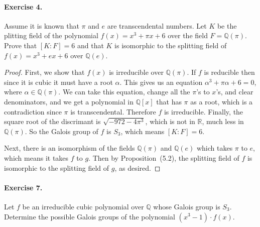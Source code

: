 \documentclass{article}
\newcommand{\Q}{\mathbb Q}
\newcommand{\R}{\mathbb R}
\begin{document}
\paragraph{Exercise 4.} Assume it is known that $\pi$ and $e$ are
transcendental numbers. Let $K$ be the plitting field of the
polynomial $f(x)=x^3+\pi x+6$ over the field $F=\Q(\pi)$. Prove that
$[K:F]=6$ and that $K$ is isomorphic to the splitting field of
$f(x)=x^3+ex+6$ over $\Q(e)$.

\begin{proof}
First, we show that $f(x)$ is irreducible over $\Q(\pi)$. If $f$ is
reducible then since it is cubic it must have a root $\alpha$. This
gives us an equation $\alpha^3+\pi \alpha+6=0$, where $\alpha\in
\Q(\pi)$. We can take this equation, change all the $\pi$'s to $x$'s,
and clear denominators, and we get a polynomial in $\Q[x]$ that has
$\pi$ as a root, which is a contradiction since $\pi$ is
transcendental. Therefore $f$ is irreducible. Finally, the square root
of the discrimant is $\sqrt{-972-4\pi^3}$, which is not in $\R$, much
less in $\Q(\pi)$. So the Galois group of $f$ is $S_3$, which means
$[K:F]=6$. 

Next, there is an isomorphism of the fields $\Q(\pi)$ and $\Q(e)$
which takes $\pi$ to $e$, which means it takes $f$ to $g$. Then by
Proposition~(5.2), the splitting field of $f$ is isomorphic to the
splitting field of $g$, as desired.
\end{proof}

\paragraph{Exercise 7.} Let $f$ be an irreducible cubic polynomial
over $\mathbb Q$ whose Galois group is $S_3$. Determine the possible
Galois groups of the polynomial $(x^3-1)\cdot f(x)$. 
\end{document}
